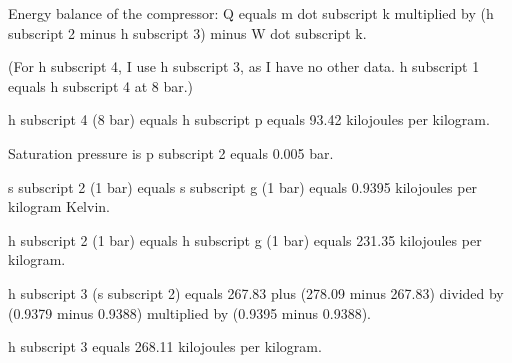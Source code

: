 Energy balance of the compressor:  
Q equals m dot subscript k multiplied by (h subscript 2 minus h subscript 3) minus W dot subscript k.  

(For h subscript 4, I use h subscript 3, as I have no other data. h subscript 1 equals h subscript 4 at 8 bar.)  

h subscript 4 (8 bar) equals h subscript p equals 93.42 kilojoules per kilogram.  

Saturation pressure is p subscript 2 equals 0.005 bar.  

s subscript 2 (1 bar) equals s subscript g (1 bar) equals 0.9395 kilojoules per kilogram Kelvin.  

h subscript 2 (1 bar) equals h subscript g (1 bar) equals 231.35 kilojoules per kilogram.  

h subscript 3 (s subscript 2) equals 267.83 plus (278.09 minus 267.83) divided by (0.9379 minus 0.9388) multiplied by (0.9395 minus 0.9388).  

h subscript 3 equals 268.11 kilojoules per kilogram.
